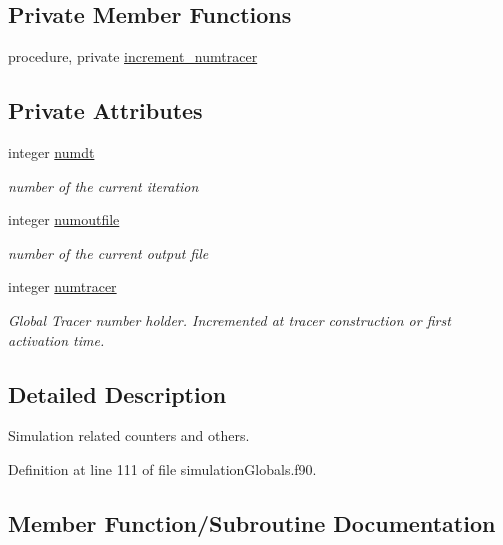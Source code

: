 \subsection*{Private Member Functions}
\begin{DoxyCompactItemize}
\item 
procedure, private \mbox{\hyperlink{structsimulationglobals__mod_1_1sim__t_afef25e0feaad4ec1cff7afd93bc53812}{increment\+\_\+numtracer}}
\end{DoxyCompactItemize}
\subsection*{Private Attributes}
\begin{DoxyCompactItemize}
\item 
integer \mbox{\hyperlink{structsimulationglobals__mod_1_1sim__t_acf2dd4822ebd48541ac6d018038b286a}{numdt}}
\begin{DoxyCompactList}\small\item\em number of the current iteration \end{DoxyCompactList}\item 
integer \mbox{\hyperlink{structsimulationglobals__mod_1_1sim__t_a5ae529652641c13a5471697d84b5db77}{numoutfile}}
\begin{DoxyCompactList}\small\item\em number of the current output file \end{DoxyCompactList}\item 
integer \mbox{\hyperlink{structsimulationglobals__mod_1_1sim__t_a23cc2df1e0cf56990759076ed07b69f1}{numtracer}}
\begin{DoxyCompactList}\small\item\em Global Tracer number holder. Incremented at tracer construction or first activation time. \end{DoxyCompactList}\end{DoxyCompactItemize}


\subsection{Detailed Description}
Simulation related counters and others. 

Definition at line 111 of file simulation\+Globals.\+f90.



\subsection{Member Function/\+Subroutine Documentation}
\mbox{\label{structsimulationglobals__mod_1_1sim__t_a4f67d96ae861d1600d365cc86acbc1a7}} 
